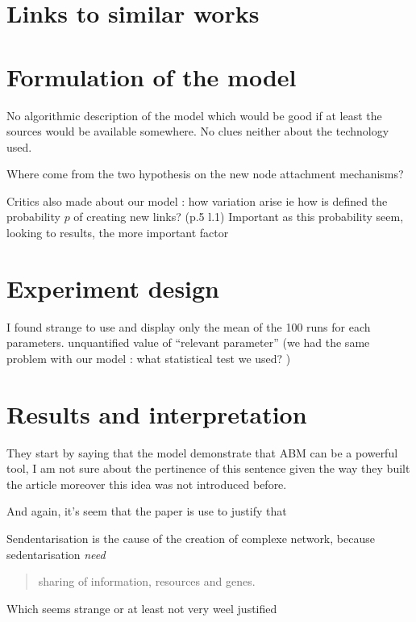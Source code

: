 \documentclass[a4paper]{article}
\begin{document}
\section{Links to similar works}


\section{Formulation of the model}

No algorithmic description of the model which would be good if at least the sources would be available somewhere. No clues neither about the technology used.

Where come from the two hypothesis on the new node attachment mechanisms?

Critics also made about our model : how variation arise ie how is defined the probability $p$ of creating new links? (p.5 l.1)
Important as this probability seem, looking to results, the more important factor

\section{Experiment design}

I found strange to use and display only the mean of the 100 runs for each parameters.
unquantified value of ``relevant parameter'' (we had the same problem with our model : what statistical test we used? )

\section{Results and interpretation}
They start by saying that the model demonstrate that ABM can be a powerful tool, I am not sure about the pertinence of this sentence given the way they built the article moreover this idea was not introduced before.

And again, it's seem that the paper is use to justify that 

Sendentarisation is the cause of the creation of complexe network, because sedentarisation \emph{need}
\begin{quote}
    sharing of information, resources and genes.
\end{quote}

Which seems strange or at least not very weel justified
\end{document}

